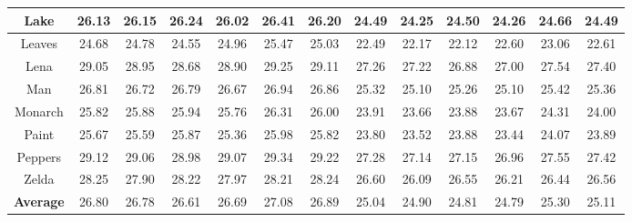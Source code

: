 \begin{table}[t!]
\begin{adjustwidth}{-0.2cm}{}
\begin{center}
\begin{tabular}{|c||c|c|c|c|c|c||c|c|c|c|c|c|}
\\
\hline
 Lake   &  26.13  & 26.15  & 26.24  &  26.02  & 26.41 &26.20    & 24.49 & 24.25 & 24.50 & 24.26 &24.66 &24.49   
\\
\hline
 Leaves   & 24.68 & 24.78   & 24.55  & 24.96 & 25.47 &25.03     & 22.49  & 22.17 & 22.12 &  22.60 & 23.06 & 22.61
\\
\hline
 Lena  & 29.05 & 28.95 & 28.68 & 28.90 &  29.25 & 29.11      & 27.26 & 27.22 &  26.88 & 27.00 & 27.54 &  27.40   
\\
\hline
 Man   & 26.81 & 26.72    & 26.79 & 26.67 &  26.94 & 26.86   & 25.32 & 25.10  & 25.26  & 25.10 &  25.42 & 25.36      
\\
\hline
 Monarch  & 25.82 & 25.88 & 25.94 & 25.76 & 26.31 & 26.00   & 23.91 & 23.66  &  23.88   &  23.67& 24.31 & 24.00   
\\
\hline
 Paint & 25.67 & 25.59 & 25.87 & 25.36 &25.98 & 25.82     &  23.80 & 23.52 &  23.88 & 23.44 &24.07 & 23.89  
\\
\hline
 Peppers & 29.12 & 29.06 & 28.98 & 29.07 & 29.34 & 29.22     & 27.28 & 27.14 &  27.15 & 26.96 &  27.55   & 27.42
\\
\hline
 Zelda  & 28.25 & 27.90 & 28.22 & 27.97 & 28.21 & 28.24       & 26.60 & 26.09 &  26.55  & 26.21  & 26.44 & 26.56
\\
\hline
 \textbf{Average}& 26.80 &  26.78 &  26.61  & 26.69  & 27.08 & 26.89    &25.04 &24.90 &24.81 &24.79 &25.30 &25.11     
\\
\hline
\end{tabular}
\end{center}
\end{adjustwidth}
\end{table}



